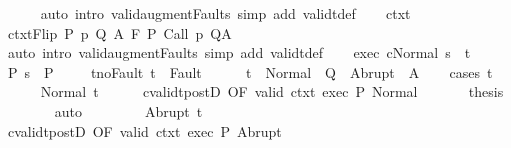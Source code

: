 \begin{isabellebody}
\ \ \ \ \isamarkupfalse%
\ {\isacharparenleft}auto\ intro{\isacharcolon}\ valid{\isacharunderscore}augment{\isacharunderscore}Faults\ simp\ add{\isacharcolon}\ validt{\isacharunderscore}def{\isacharparenright}\isanewline
\ \ \isamarkupfalse%
\ ctxt\ \isamarkupfalse%
\ ctxtFlip{\isacharcolon}\ {\isachardoublequoteopen}{\isasymforall}{\isacharparenleft}P{\isacharcomma}\ p{\isacharcomma}\ Q{\isacharcomma}\ A{\isacharparenright}{\isasymin}{\isasymTheta}{\isachardot}\ {\isasymGamma}{\isasymTurnstile}\isactrlbsub {\isacharslash}{\isacharminus}F\isactrlesub \ P\ {\isacharparenleft}Call\ p{\isacharparenright}\ Q{\isacharcomma}A{\isachardoublequoteclose}\ \isanewline
\ \ \ \ \isamarkupfalse%
\ {\isacharparenleft}auto\ intro{\isacharcolon}\ valid{\isacharunderscore}augment{\isacharunderscore}Faults\ simp\ add{\isacharcolon}\ validt{\isacharunderscore}def{\isacharparenright}\isanewline
\ \ \isamarkupfalse%
\ exec{\isacharcolon}\ {\isachardoublequoteopen}{\isasymGamma}{\isasymturnstile}{\isasymlangle}c{\isacharcomma}Normal\ s{\isasymrangle}\ {\isasymRightarrow}\ t{\isachardoublequoteclose}\ \isanewline
\ \ \isamarkupfalse%
\ P{\isacharcolon}\ {\isachardoublequoteopen}s\ {\isasymin}\ P{\isachardoublequoteclose}\ \isanewline
\ \ \isamarkupfalse%
\ t{\isacharunderscore}noFault{\isacharcolon}\ {\isachardoublequoteopen}t\ {\isasymnotin}\ Fault\ {\isacharbackquote}\ {\isacharbraceleft}{\isacharbraceright}{\isachardoublequoteclose}\isanewline
\ \ \isamarkupfalse%
\ {\isachardoublequoteopen}t\ {\isasymin}\ Normal\ {\isacharbackquote}\ Q\ {\isasymunion}\ Abrupt\ {\isacharbackquote}\ A{\isachardoublequoteclose}\isanewline
\ \ \isamarkupfalse%
\ {\isacharparenleft}cases\ t{\isacharparenright}\isanewline
\ \ \ \ \isamarkupfalse%
\ {\isacharparenleft}Normal\ t{\isacharprime}{\isacharparenright}\isanewline
\ \ \ \ \isamarkupfalse%
\ cvalidt{\isacharunderscore}postD\ {\isacharbrackleft}OF\ valid\ ctxt{\isacharprime}\ exec\ P{\isacharbrackright}\ Normal\ \isanewline
\ \ \ \ \isamarkupfalse%
\ {\isacharquery}thesis\isanewline
\ \ \ \ \ \ \isamarkupfalse%
\ auto\isanewline
\ \ \isamarkupfalse%
\isanewline
\ \ \ \ \isamarkupfalse%
\ {\isacharparenleft}Abrupt\ t{\isacharprime}{\isacharparenright}\isanewline
\ \ \ \ \isamarkupfalse%
\ cvalidt{\isacharunderscore}postD\ {\isacharbrackleft}OF\ valid\ ctxt{\isacharprime}\ exec\ P{\isacharbrackright}\ Abrupt\ \isanewline

\end{isabellebody}

